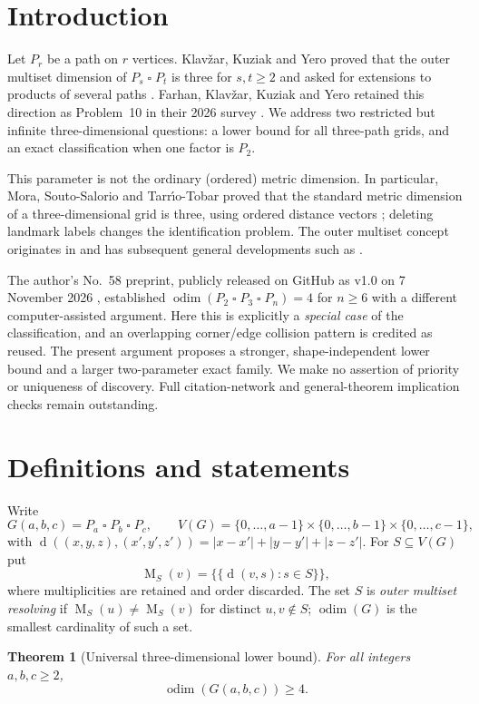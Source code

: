 \documentclass[10pt,a4paper]{article}
\newtheorem{theorem}{Theorem}
\newcommand{\odim}{\operatorname{odim}}
\newcommand{\dm}{\operatorname{d}}
\newcommand{\MS}{\operatorname{M}}
\newcommand{\boxp}{\mathbin{\square}}
\newcommand{\Zn}[1]{\{0,\ldots,#1\}}
\begin{document}
\section{Introduction}
Let $P_r$ be a path on $r$ vertices. Klav\v{z}ar, Kuziak and Yero proved that the outer multiset dimension of $P_s\boxp P_t$ is three for $s,t\ge2$ and asked for extensions to products of several paths \cite{Klavzar2023}. Farhan, Klav\v{z}ar, Kuziak and Yero retained this direction as Problem~10 in their 2026 survey \cite{Farhan2026}. We address two restricted but infinite three-dimensional questions: a lower bound for all three-path grids, and an exact classification when one factor is $P_2$.

This parameter is not the ordinary (ordered) metric dimension. In particular, Mora, Souto-Salorio and Tarr\'{\i}o-Tobar proved that the standard metric dimension of a three-dimensional grid is three, using ordered distance vectors \cite{Mora2022}; deleting landmark labels changes the identification problem. The outer multiset concept originates in \cite{GilPons2019} and has subsequent general developments such as \cite{Araujo2026}.

The author's No.~58 preprint, publicly released on GitHub as v1.0 on 7 November 2026 \cite{Yonezu58}, established $\odim(P_2\boxp P_3\boxp P_n)=4$ for $n\ge6$ with a different computer-assisted argument. Here this is explicitly a \emph{special case} of the classification, and an overlapping corner/edge collision pattern is credited as reused. The present argument proposes a stronger, shape-independent lower bound and a larger two-parameter exact family. We make no assertion of priority or uniqueness of discovery. Full citation-network and general-theorem implication checks remain outstanding.

\section{Definitions and statements}
Write
\[
G(a,b,c)=P_a\boxp P_b\boxp P_c,\qquad
V(G)=\Zn{a-1}\times\Zn{b-1}\times\Zn{c-1},
\]
with $\dm((x,y,z),(x',y',z'))=|x-x'|+|y-y'|+|z-z'|$. For $S\subseteq V(G)$ put
\[
\MS_S(v)=\{\!\{\dm(v,s):s\in S\}\!\},
\]
where multiplicities are retained and order discarded. The set $S$ is \emph{outer multiset resolving} if $\MS_S(u)\ne\MS_S(v)$ for distinct $u,v\notin S$; $\odim(G)$ is the smallest cardinality of such a set.

\begin{theorem}[Universal three-dimensional lower bound]\label{thm:lower}
For all integers $a,b,c\ge2$,
\[\odim(G(a,b,c))\ge4.\]
\end{theorem}
\end{document}
